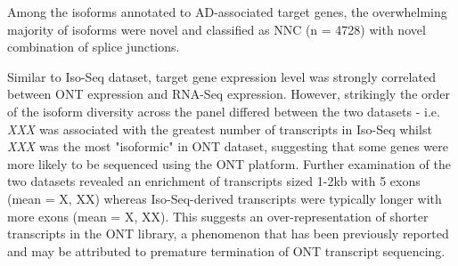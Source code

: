 Among the isoforms annotated to AD-associated target genes, the overwhelming majority of isoforms were novel and classified as NNC (n = 4728) with novel combination of splice junctions. 

Similar to Iso-Seq dataset, target gene expression level was strongly correlated between ONT expression and RNA-Seq expression. However, strikingly the order of the isoform diversity across the panel differed between the two datasets - i.e. \textit{XXX} was associated with the greatest number of transcripts in Iso-Seq whilst \textit{XXX} was the most "isoformic" in ONT dataset, suggesting that some genes were more likely to be sequenced using the ONT platform. Further examination of the two datasets revealed an enrichment of transcripts sized 1-2kb with 5 exons (mean = X, XX) whereas Iso-Seq-derived transcripts were typically longer with more exons (mean = X, XX). This suggests an over-representation of shorter transcripts in the ONT library, a phenomenon that has been previously reported and may be attributed to premature termination of ONT transcript sequencing. 

